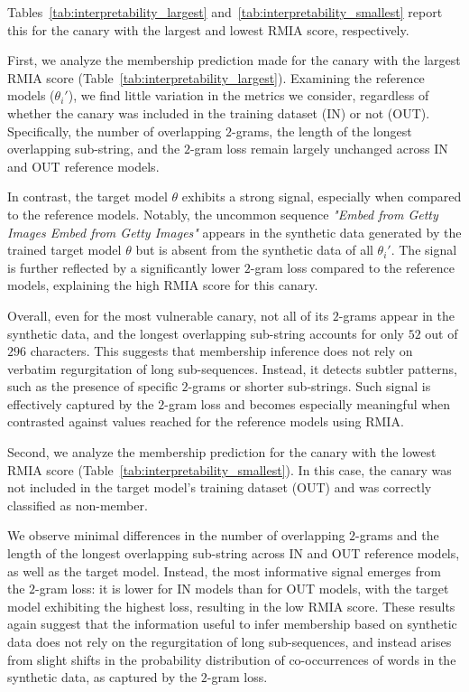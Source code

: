 Tables~\ref{tab:interpretability_largest} and~\ref{tab:interpretability_smallest} report this for the canary with the largest and lowest RMIA score, respectively. 

First, we analyze the membership prediction made for the canary with the largest RMIA score (Table~\ref{tab:interpretability_largest}). Examining the reference models ($\theta_i'$), we find little variation in the metrics we consider, regardless of whether the canary was included in the training dataset (IN) or not (OUT). Specifically, the number of overlapping $2$-grams, the length of the longest overlapping sub-string, and the $2$-gram loss remain largely unchanged across IN and OUT reference models. 

In contrast, the target model $\theta$ exhibits a strong signal, especially when compared to the reference models. Notably, the uncommon sequence \emph{"Embed from Getty Images Embed from Getty Images"} appears in the synthetic data generated by the trained target model $\theta$ but is absent from the synthetic data of all $\theta_i'$. The signal is further reflected by a significantly lower $2$-gram loss compared to the reference models, explaining the high RMIA score for this canary.

Overall, even for the most vulnerable canary, not all of its $2$-grams appear in the synthetic data, and the longest overlapping sub-string accounts for only $52$ out of $296$ characters. This suggests that membership inference does not rely on verbatim regurgitation of long sub-sequences. Instead, it detects subtler patterns, such as the presence of specific $2$-grams or shorter sub-strings. Such signal is effectively captured by the $2$-gram loss and becomes especially meaningful when contrasted against values reached for the reference models using RMIA.

Second, we analyze the membership prediction for the canary with the lowest RMIA score (Table~\ref{tab:interpretability_smallest}). In this case, the canary was not included in the target model's training dataset (OUT) and was correctly classified as non-member.

We observe minimal differences in the number of overlapping $2$-grams and the length of the longest overlapping sub-string across IN and OUT reference models, as well as the target model. Instead, the most informative signal emerges from the $2$-gram loss: it is lower for IN models than for OUT models, with the target model exhibiting the highest loss, resulting in the low RMIA score. These results again suggest that the information useful to infer membership based on synthetic data does not rely on the regurgitation of long sub-sequences, and instead arises from slight shifts in the probability distribution of co-occurrences of words in the synthetic data, as captured by the $2$-gram loss. 

